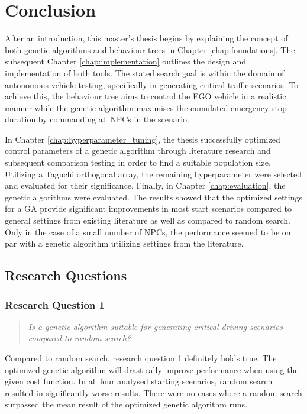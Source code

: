 \chapter{Conclusion}
\label{chap:conclusion}
After an introduction, this master's thesis begins by explaining the concept of both genetic algorithms and behaviour trees in Chapter \ref{chap:foundations}. The subsequent Chapter \ref{chap:implementation} outlines the design and implementation of both tools. The stated search goal is within the domain of autonomous vehicle testing, specifically in generating critical traffic scenarios. To achieve this, the behaviour tree aims to control the EGO vehicle in a realistic manner while the genetic algorithm maximises the cumulated emergency stop duration by commanding all NPCs in the scenario. 

In Chapter \ref{chap:hyperparameter_tuning}, the thesis successfully optimized control parameters of a genetic algorithm through literature research and subsequent comparison testing in order to find a suitable population size. Utilizing a Taguchi orthogonal array, the remaining hyperparameter were selected and evaluated for their significance. Finally, in Chapter \ref{chap:evaluation}, the genetic algorithms were evaluated. The results showed that the optimized settings for a GA provide significant improvements in most start scenarios compared to general settings from existing literature as well as compared to random search. Only in the case of a small number of NPCs, the performance seemed to be on par with a genetic algorithm utilizing settings from the literature.

\section{Research Questions}
\subsection{Research Question 1}
\begin{quote}
	\begin{em}
		\textit{Is a genetic algorithm suitable for generating critical driving scenarios compared to random search?}
	\end{em}
\end{quote}

Compared to random search, research question 1 definitely holds true. The optimized genetic algorithm will drastically improve performance when using the given cost function. In all four analysed starting scenarios, random search resulted in significantly worse results. There were no cases where a random search surpassed the mean result of the optimized genetic algorithm runs.

